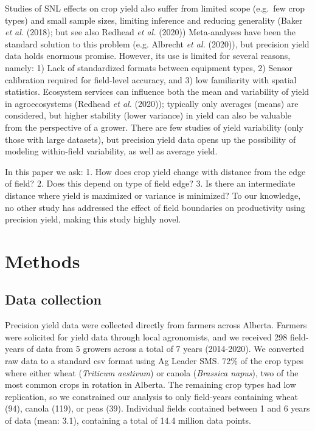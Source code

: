 \documentclass[]{elsarticle} %
\begin{document}
Studies of SNL effects on crop yield also suffer from limited scope (e.g.~few crop types) and small sample sizes, limiting inference and reducing generality (Baker \emph{et al.} (2018); but see also Redhead \emph{et al.} (2020))
Meta-analyses have been the standard solution to this problem (e.g. Albrecht \emph{et al.} (2020)), but precision yield data holds enormous promise.
However, its use is limited for several reasons, namely: 1) Lack of standardized formats between equipment types, 2) Sensor calibration required for field-level accuracy, and 3) low familiarity with spatial statistics.
Ecosystem services can influence both the mean and variability of yield in agroecosystems (Redhead \emph{et al.} (2020)); typically only averages (means) are considered, but higher stability (lower variance) in yield can also be valuable from the perspective of a grower.
There are few studies of yield variability (only those with large datasets), but precision yield data opens up the possibility of modeling within-field variability, as well as average yield.

In this paper we ask:
1. How does crop yield change with distance from the edge of field?
2. Does this depend on type of field edge?
3. Is there an intermediate distance where yield is maximized or variance is minimized?
To our knowledge, no other study has addressed the effect of field boundaries on productivity using precision yield, making this study highly novel.

\hypertarget{methods}{%
\section{Methods}\label{methods}}

\hypertarget{data-collection}{%
\subsection{Data collection}\label{data-collection}}

Precision yield data were collected directly from farmers across Alberta.
Farmers were solicited for yield data through local agronomists, and we received 298 field-years of data from 5 growers across a total of 7 years (2014-2020).
We converted raw data to a standard csv format using Ag Leader SMS.
72\% of the crop types where either wheat (\emph{Triticum aestivum}) or canola (\emph{Brassica napus}), two of the most common crops in rotation in Alberta.
The remaining crop types had low replication, so we constrained our analysis to only field-years containing wheat (94), canola (119), or peas (39).
Individual fields contained between 1 and 6 years of data (mean: 3.1), containing a total of 14.4 million data points.
\end{document}
